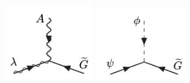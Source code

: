 \vspace{5mm}
\begin{minipage}{0.90\linewidth}
\begin{center}
\centering
\mbox{\includegraphics[height=0.3\textwidth, width=0.3\textwidth]{THESISPLOTS/Gravitino-Gaugino-Coupling.png} \quad
\includegraphics[height=0.3\textwidth, width=0.3\textwidth]{THESISPLOTS/Gravitino-Scalar-Coupling.png}
} 
\label{fig:feynman_grav}
\end{center}
\end{minipage}

